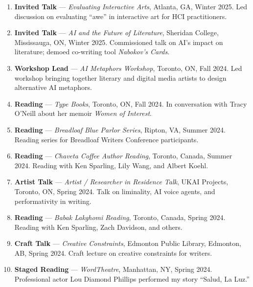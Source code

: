 \begin{enumerate}
\item \textbf{Invited Talk} --- \emph{Evaluating Interactive Arts}, Atlanta, GA, Winter 2025.
\subitem Led discussion on evaluating ``awe'' in interactive art for HCI practitioners.

\item \textbf{Invited Talk} --- \emph{AI and the Future of Literature}, Sheridan College, Mississauga, ON, Winter 2025.
\subitem Commissioned talk on AI's impact on literature; demoed co-writing tool \emph{Nabokov's Cards}.

\item \textbf{Workshop Lead} --- \emph{AI Metaphors Workshop}, Toronto, ON, Fall 2024.
\subitem Led workshop bringing together literary and digital media artists to design alternative AI metaphors.

\item \textbf{Reading} --- \emph{Type Books}, Toronto, ON, Fall 2024.
\subitem In conversation with Tracy O'Neill about her memoir \emph{Women of Interest}.

\item \textbf{Reading} --- \emph{Breadloaf Blue Parlor Series}, Ripton, VA, Summer 2024.
\subitem Reading series for Breadloaf Writers Conference participants.

\item \textbf{Reading} --- \emph{Chaveta Coffee Author Reading}, Toronto, Canada, Summer 2024.
\subitem Reading with Ken Sparling, Lily Wang, and Albert Koehl.

\item \textbf{Artist Talk} --- \emph{Artist / Researcher in Residence Talk}, UKAI Projects, Toronto, ON, Spring 2024.
\subitem Talk on liminality, AI voice agents, and performativity in writing.

\item \textbf{Reading} --- \emph{Babak Lakghomi Reading}, Toronto, Canada, Spring 2024.
\subitem Reading with Ken Sparling, Zach Davidson, and others.

\item \textbf{Craft Talk} --- \emph{Creative Constraints}, Edmonton Public Library, Edmonton, AB, Spring 2024.
\subitem Craft lecture on creative constraints for writers.

\item \textbf{Staged Reading} --- \emph{WordTheatre}, Manhattan, NY, Spring 2024.
\subitem Professional actor Lou Diamond Phillips performed my story ``Salud, La Luz.''


\end{enumerate}
